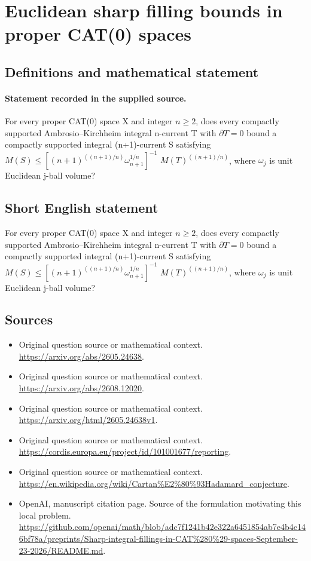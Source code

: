 \documentclass[11pt]{article}
\begin{document}
\section*{Euclidean sharp filling bounds in proper CAT(0) spaces}\label{30007154}
\subsection{Definitions and mathematical statement}
\paragraph{Statement recorded in the supplied source.}
For every proper CAT(0) space X and integer $n\geq 2$, does every compactly supported Ambrosio–Kirchheim integral n-current T with $\partial T=0$ bound a compactly supported integral (n+1)-current S satisfying $M(S)\leq [(n+1)^((n+1)/n)\omega _{n+1}^{1/n}]^{-1}$ $M(T)^((n+1)/n)$, where $\omega _j$ is unit Euclidean j-ball volume?
\subsection{Short English statement}
For every proper CAT(0) space X and integer $n\geq 2$, does every compactly supported Ambrosio–Kirchheim integral n-current T with $\partial T=0$ bound a compactly supported integral (n+1)-current S satisfying $M(S)\leq [(n+1)^((n+1)/n)\omega _{n+1}^{1/n}]^{-1}$ $M(T)^((n+1)/n)$, where $\omega _j$ is unit Euclidean j-ball volume?
\subsection{Sources}
\begin{itemize}
\item[S1] Original question source or mathematical context.
\url{https://arxiv.org/abs/2605.24638}.
\item[S2] Original question source or mathematical context.
\url{https://arxiv.org/abs/2608.12020}.
\item[S3] Original question source or mathematical context.
\url{https://arxiv.org/html/2605.24638v1}.
\item[S4] Original question source or mathematical context.
\url{https://cordis.europa.eu/project/id/101001677/reporting}.
\item[S5] Original question source or mathematical context.
\url{https://en.wikipedia.org/wiki/Cartan%E2%80%93Hadamard_conjecture}.
\item[S6] OpenAI, manuscript citation page. Source of the formulation motivating this local problem.
\url{https://github.com/openai/math/blob/adc7f1241b42e322a6451854ab7e4b4c146bf78a/preprints/Sharp-integral-fillings-in-CAT%280%29-spaces-September-23-2026/README.md}.
\end{itemize}
\end{document}
